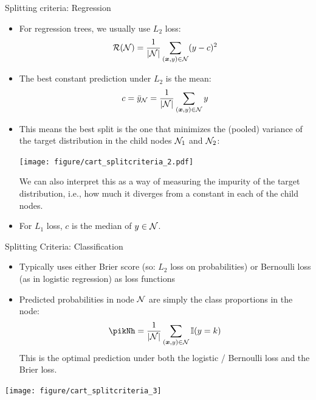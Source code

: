 \documentclass[11pt,compress,t,notes=noshow, xcolor=table]{beamer}
\newenvironment{knitrout}{}{} %
\begin{document}
\begin{vbframe}{Splitting criteria: Regression}
\begin{itemize}
 \item For regression trees, we usually use $L_2$ loss:
  $$\mathcal{R}(\mathcal{N}) = \frac{1}{|\mathcal{N}|} \sum\limits_{(\bm{x},y) \in \mathcal{N}} (y - c)^2$$
 \item The best constant prediction under $L_2$ is the mean:
  $$c = \bar{y}_{\mathcal{N}} = \frac{1}{|\mathcal{N}|} \sum\limits_{(\bm{x},y) \in \mathcal{N}} y$$
\end{itemize}

\framebreak

\begin{itemize}
\item This means the best split is the one that minimizes the (pooled) variance of the target distribution in the child nodes $\mathcal{N}_1$ and $\mathcal{N}_2$:
\begin{knitrout}\scriptsize
{}\color{fgcolor}

{\centering \texttt{[image: figure/cart\_splitcriteria\_2.pdf]} 

}



\end{knitrout}
We can also interpret this as a way of measuring the impurity of the target distribution, i.e., how much it diverges from a constant in each of the child nodes.
\item For $L_1$ loss, $c$ is the median of $y \in \mathcal{N}$.
\end{itemize}
\end{vbframe}

\begin{vbframe}{Splitting Criteria: Classification}

\begin{itemize}
\item Typically uses either Brier score (so: $L_2$ loss on probabilities) or  Bernoulli loss (as in logistic regression) as loss functions
\item Predicted probabilities in node $\mathcal{N}$ are simply the class proportions in the node:
$$ \pikNh = \frac{1}{|\Np|} \sum\limits_{(\xv,y) \in \Np} \I(y = k) $$
This is the optimal prediction under both the logistic / Bernoulli loss and the Brier loss.
\end{itemize}

\begin{knitrout}\scriptsize
{}\color{fgcolor}

{\centering \texttt{[image: figure/cart\_splitcriteria\_3]} 

}



\end{knitrout}
\end{vbframe}
\end{document}
